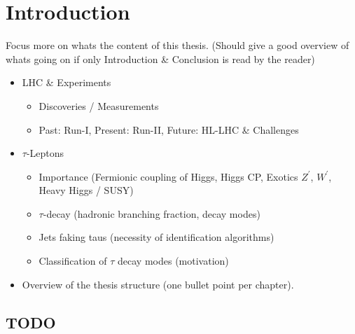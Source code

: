 \chapter*{Introduction}
\label{sec:intro}

Focus more on whats the content of this thesis. (Should give a good overview of
whats going on if only Introduction \& Conclusion is read by the reader)

\begin{itemize}
\item LHC \& Experiments
  \begin{itemize}
  \item Discoveries / Measurements

  \item Past: Run-I, Present: Run-II, Future: HL-LHC \& Challenges
  \end{itemize}

\item $\tau$-Leptons
  \begin{itemize}
  \item Importance (Fermionic coupling of Higgs, Higgs CP, Exotics $Z^\prime$,
    $W^\prime$, Heavy Higgs / SUSY)
  \item $\tau$-decay (hadronic branching fraction, decay modes)
  \item Jets faking taus (necessity of identification algorithms)
  \item Classification of $\tau$ decay modes (motivation)
  \end{itemize}

\item Overview of the thesis structure (one bullet point per chapter).
\end{itemize}

\section{TODO}
\label{sec:TODO}

